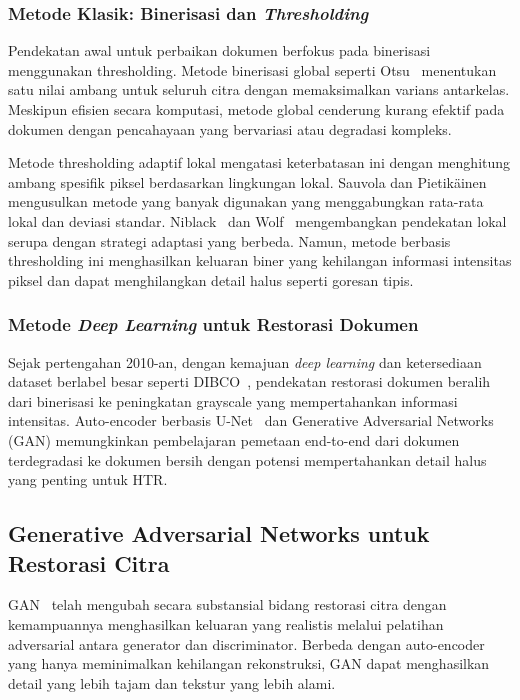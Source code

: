 \documentclass[journal]{IEEEtran}
\begin{document}
\subsubsection{Metode Klasik: Binerisasi dan \textit{Thresholding}}

Pendekatan awal untuk perbaikan dokumen berfokus pada binerisasi menggunakan thresholding. Metode binerisasi global seperti Otsu~\cite{otsu1979threshold} menentukan satu nilai ambang untuk seluruh citra dengan memaksimalkan varians antarkelas. Meskipun efisien secara komputasi, metode global cenderung kurang efektif pada dokumen dengan pencahayaan yang bervariasi atau degradasi kompleks.

Metode thresholding adaptif lokal mengatasi keterbatasan ini dengan menghitung ambang spesifik piksel berdasarkan lingkungan lokal. Sauvola dan Pietikäinen~\cite{sauvola2000adaptive} mengusulkan metode yang banyak digunakan yang menggabungkan rata-rata lokal dan deviasi standar. Niblack~\cite{niblack1986introduction} dan Wolf~\cite{wolf2004extraction} mengembangkan pendekatan lokal serupa dengan strategi adaptasi yang berbeda. Namun, metode berbasis thresholding ini menghasilkan keluaran biner yang kehilangan informasi intensitas piksel dan dapat menghilangkan detail halus seperti goresan tipis.

\subsubsection{Metode \textit{Deep Learning} untuk Restorasi Dokumen}

Sejak pertengahan 2010-an, dengan kemajuan \textit{deep learning} dan ketersediaan dataset berlabel besar seperti DIBCO~\cite{pratikakis2016hdibco}, pendekatan restorasi dokumen beralih dari binerisasi ke peningkatan grayscale yang mempertahankan informasi intensitas. Auto-encoder berbasis U-Net~\cite{ronneberger2015unet} dan Generative Adversarial Networks (GAN) memungkinkan pembelajaran pemetaan end-to-end dari dokumen terdegradasi ke dokumen bersih dengan potensi mempertahankan detail halus yang penting untuk HTR.

\subsection{Generative Adversarial Networks untuk Restorasi Citra}

GAN~\cite{goodfellow2016improved} telah mengubah secara substansial bidang restorasi citra dengan kemampuannya menghasilkan keluaran yang realistis melalui pelatihan adversarial antara generator dan discriminator. Berbeda dengan auto-encoder yang hanya meminimalkan kehilangan rekonstruksi, GAN dapat menghasilkan detail yang lebih tajam dan tekstur yang lebih alami.
\end{document}
